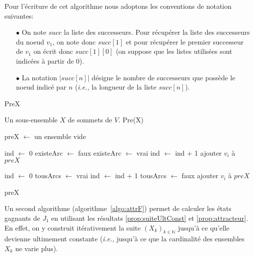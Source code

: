 \begin{notations}
	Pour l'écriture de cet algorithme nous adoptons les conventions de notation suivantes:
	\begin{itemize}
		\item[$\bullet$] On note $succ$ la liste des successeurs. Pour récupérer la liste des successeurs du noeud $v_1$, on note donc $succ[1]$ et pour récupérer le premier successeur de $v_1$ on écrit donc $succ[1][0]$ (on suppose que les listes utilisées sont indicées à partir de 0).
		\item[$\bullet$] La notation $|succ[n]|$ désigne le nombre de successeurs que possède le noeud indicé par $n$ (\emph{i.e.,} la longueur de la liste $succ[n]$).
	\end{itemize}
\end{notations}

\begin{algorithm}
	\caption{PreX}
	\label{algo:preX}
	\begin{algorithmic}[1]
		\REQUIRE Un sous-ensemble $X$ de sommets de $V$.
		\ENSURE Pre(X)
		
		\STATE preX $\leftarrow$ un ensemble vide
		
			\STATE ind $\leftarrow$ 0
			\STATE existeArc $\leftarrow$ faux
					\STATE existeArc $\leftarrow$ vrai
				\ELSE
					\STATE ind $\leftarrow$ ind + 1
				\ENDIF
			\ENDWHILE
				\STATE ajouter $v_{i}$ à $preX$
			\ENDIF
		\ENDFOR
		
			\STATE ind $\leftarrow$ 0
			\STATE tousArcs $\leftarrow$ vrai
					\STATE ind $\leftarrow$ ind + 1
				\ELSE
					\STATE  tousArcs $\leftarrow$ faux
				\ENDIF
			\ENDWHILE
				\STATE ajouter $v_{i}$ à $preX$
			\ENDIF
		\ENDFOR
		
		\RETURN preX
			
\end{algorithmic}
		
\end{algorithm}

Un second algorithme (algorithme~\ref{algo:attrF}) permet de calculer les états gagnants de $J_{1}$ en utilisant les résultats \ref{prop:suiteUltConst} et \ref{prop:attracteur}. En effet, on y construit itérativement la suite $(X_{k})_{k \in \mathbb{N}}$ jusqu'à ce qu'elle devienne ultimement constante (\emph{i.e.,} jusqu'à ce que la cardinalité des ensembles $X_{k}$ ne varie plus).

